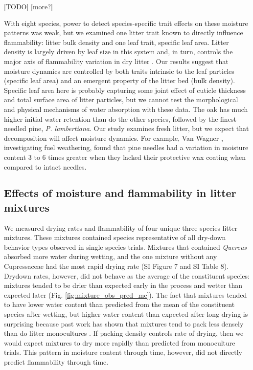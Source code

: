 \documentclass[letterpaper,12pt]{article}
\begin{document}
[TODO] [more?]

With eight species, power to detect species-specific trait effects on these
moisture patterns was weak, but we examined one litter trait known to directly
influence flammability: litter bulk density and one leaf trait, specific leaf
area. Litter density is largely driven by leaf size in this system and, in
turn, controls the major axis of flammability variation in dry litter
\citep{Magalhaes+Schwilk-2012}. Our results suggest that moisture dynamics are
controlled by both traits intrinsic to the leaf particles (specific leaf area)
and an emergent property of the litter bed (bulk density). Specific leaf area
here is probably capturing some joint effect of cuticle thickness and total
surface area of litter particles, but we cannot test the morphological and
physical mechanisms of water absorption with these data. The oak has much
higher initial water retention than do the other species, followed by the
finest-needled pine, \emph{P. lambertiana}. Our study examines fresh litter,
but we expect that decomposition will affect moisture dynamics. For example,
Van Wagner \citeyear{Van_Wagner-1969}, investigating fuel weathering, found
that pine needles had a variation in moisture content 3 to 6 times greater when
they lacked their protective wax coating when compared to intact needles.

\subsection*{Effects of moisture and flammability in litter mixtures}

We measured drying rates and flammability of four unique three-species litter
mixtures. These mixtures contained species representative of all dry-down
behavior types observed in single species trials. Mixtures that contained
\emph{Quercus} absorbed more water during wetting, and the one mixture without
any Cupressaceae had the most rapid drying rate (SI Figure 7 and SI Table 8).
Drydown rates, however, did not behave as the average of the constituent
species: mixtures tended to be drier than expected early in the process and
wetter than expected later (Fig. \ref{fig:mixture_obs_pred_mc}). The fact that
mixtures tended to have lower water content than predicted from the mean of the
constituent species after wetting, but higher water content than expected after
long drying is surprising because past work has shown that mixtures tend to
pack less densely than do litter monocultures \citep[][Table
2]{Magalhaes+Schwilk-2012}. If packing density controls rate of drying, then we
would expect mixtures to dry more rapidly than predicted from monoculture
trials. This pattern in moisture content through time, however, did not
directly predict flammability through time.
\end{document}
